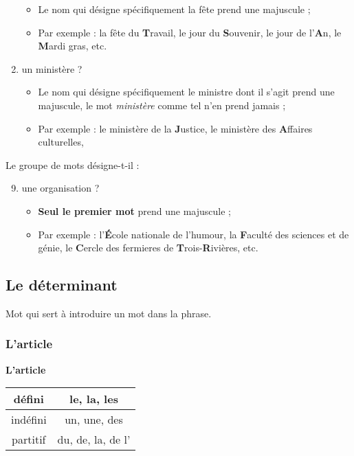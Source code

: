\documentclass[10pt, french]{article}
\begin{document}
\begin{multicols*}{2}
\begin{enumerate}
		\begin{itemize}
		\item	Le nom qui désigne spécifiquement la fête prend une majuscule ;
		\item	Par exemple : la fête du \textbf{T}ravail, le jour du \textbf{S}ouvenir, le jour de l'\textbf{A}n, le \textbf{M}ardi gras, etc.
		\end{itemize}
	\item	un ministère ?
		\begin{itemize}
		\item	Le nom qui désigne spécifiquement le ministre dont il s'agit prend une majuscule, le mot \textit{ministère} comme tel n'en prend jamais ;
		\item	Par exemple : le ministère de la \textbf{J}ustice, le ministère des \textbf{A}ffaires culturelles, 
		\end{itemize}
\end{enumerate}

Le groupe de mots désigne-t-il :
\begin{enumerate}
	\setcounter{enumi}{8}
	\item	une organisation ?
		\begin{itemize}
		\item	\textbf{Seul le premier mot} prend une majuscule ;
		\item	Par exemple : l'\textbf{É}cole nationale de l'humour, la \textbf{F}aculté des sciences et de génie, le \textbf{C}ercle des fermieres de \textbf{T}rois-\textbf{R}ivières, etc.
		\end{itemize}
\end{enumerate}


\columnbreak
\subsection{Le déterminant}
\begin{definitionNOHFILL}[Le déterminant]
Mot qui sert à introduire un mot dans la phrase.
\end{definitionNOHFILL}


\subsubsection{L'article}
\textbf{L'article}
\begin{center}
\begin{tabular}{| >{\columncolor{airforceblue}}c | >{\columncolor{beaublue}}c  |}
\hline
défini	&	le, la, les	\\\hline
indéfini	&	un, une, des	\\\hline
partitif	&	du, de, la, de l'\\\hline
\end{tabular}
\end{center}


\end{multicols*}
\end{document}
